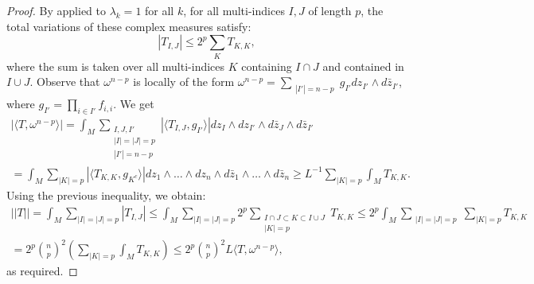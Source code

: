 \documentclass[12pt]{amsbook}%
\theoremstyle{definition}
\theoremstyle{remark}
\numberwithin{section}{chapter}
\numberwithin{subsection}{section}
\numberwithin{figure}{chapter}
\begin{document}
{{\begin{proof}
  By \cite[Proposition 1.14]{demailly} applied to $\lambda_k = 1$ for all $k$, for all multi-indices $I,J$ of length $p$, 
  the total variations of these complex measures satisfy: 
  \begin{equation*}
  |T_{I,J}| \leqslant 2^p \sum_{K}  T_{K,K},  
\end{equation*}   
where the sum is taken over all multi-indices $K$ containing $I\cap J$ and contained in $I\cup J$.
Observe that $\omega^{n-p}$ is locally of the form $ \omega^{n-p} = \sum_{\substack{|I'| = n-p}} g_{I'} dz_{I'} \wedge d\bar{z}_{I'} $, 
where $g_{I'} = \prod_{i\in I'} f_{i,i}$.
We get 
\begin{multline*}
|\langle T , \omega^{n-p} \rangle| = \int_M \sum_{\substack{I,J, I'\\ |I|= |J|= p \\
|I'| = n-p}} |\langle  T_{I,J} , g_{I'}\rangle| dz_{I} \wedge dz_{I'} \wedge d\bar{z}_{J} \wedge d\bar{z}_{I'} \\ = \int_M \sum_{|K|=p} | \langle T_{K,K}, g_{K^c} \rangle | dz_1 \wedge \ldots \wedge  dz_{n} \wedge d\bar{z}_1 \wedge \ldots \wedge d\bar{z}_n 
\geqslant L^{-1} \sum_{|K|=p} \int_M T_{K,K}. 
\end{multline*}
Using the previous inequality, we obtain: 
\begin{multline*}
||T||=\int_M \sum_{ |I| = |J|=p} |T_{I,J}| \leqslant \int_M  \sum_{ |I|= |J|=p } 2^p \sum_{\substack{I\cap J \subset K \subset I\cup J \\ |K| = p} } T_{K,K} \leqslant 2^p \int_M \sum_{\substack{|I|=|J|=p}}  \sum_{|K|=p} T_{K,K} \\ = 2^p {n \choose p}^2 \left ( \sum_{|K|=p} \int_{M} T_{K,K} \right ) \leqslant  2^p {n \choose p}^2  L \langle T, \omega^{n-p} \rangle, 
\end{multline*}
as required.
  \end{proof}

}}
\end{document}
